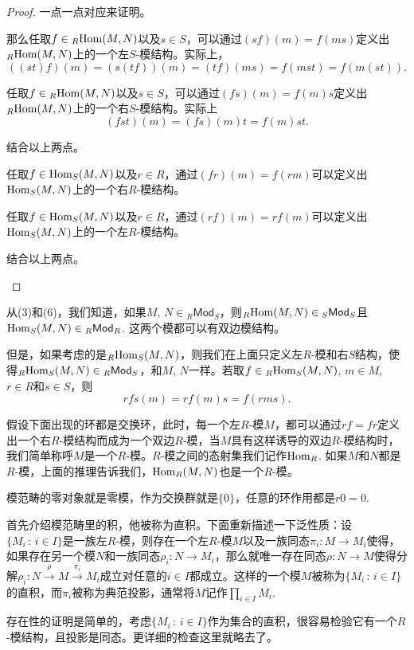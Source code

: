 \begin{proof}
一点一点对应来证明。     
\begin{compactenum}[(1)]
\item 那么任取$f\in {}_R\!\operatorname{Hom}(M,N)$以及$s\in S$，可以通过$(sf)(m)=f(ms)$定义出${}_R\!\operatorname{Hom}(M,N)$上的一个左$S$-模结构。实际上，
\[
	((st)f)(m)=(s(tf))(m)=(tf)(ms)=f(mst)=f(m(st)).
\]

\item 任取$f\in {}_R\!\operatorname{Hom}(M,N)$以及$s\in S$，可以通过$(fs)(m)=f(m)s$定义出${}_R\!\operatorname{Hom}(M,N)$上的一个右$S$-模结构。实际上
\[
	(fst)(m)=(fs)(m)t=f(m)st.
\]

\item 结合以上两点。

\item 任取$f\in \operatorname{Hom}_S(M,N)$以及$r\in R$，通过$(fr)(m)=f(rm)$可以定义出$\operatorname{Hom}_S(M,N)$上的一个右$R$-模结构。

\item 任取$f\in \operatorname{Hom}_S(M,N)$以及$r\in R$，通过$(rf)(m)=rf(m)$可以定义出$\operatorname{Hom}_S(M,N)$上的一个左$R$-模结构。

\item 结合以上两点。\qedhere
\end{compactenum}
\end{proof}

从(3)和(6)，我们知道，如果$M$, $N\in {}_R\mathsf{Mod}_S$，则${}_R\!\operatorname{Hom}(M,N)\in {}_S\mathsf{Mod}_S$且$\operatorname{Hom}_S(M,N)\in {}_R\mathsf{Mod}_R$. 这两个模都可以有双边模结构。

但是，如果考虑的是${}_R\!\operatorname{Hom}_S(M,N)$，则我们在上面只定义左$R$-模和右$S$结构，使得${}_R\!\operatorname{Hom}_S(M,N)\in {}_R\mathsf{Mod}_S$，和$M$, $N$一样。若取$f\in {}_R\!\operatorname{Hom}_S(M,N)$, $m\in M$, $r\in R$和$s\in S$，则
\[
	rfs(m)=rf(m)s=f(rms).
\]

假设下面出现的环都是交换环，此时，每一个左$R$-模$M$，都可以通过$rf=fr$定义出一个右$R$-模结构而成为一个双边$R$-模，当$M$具有这样诱导的双边$R$-模结构时，我们简单称呼$M$是一个$R$-模。$R$-模之间的态射集我们记作$\operatorname{Hom}_R$. 如果$M$和$N$都是$R$-模，上面的推理告诉我们，$\operatorname{Hom}_R(M,N)$也是一个$R$-模。

\begin{para}[零对象]
模范畴的零对象就是零模，作为交换群就是$\{0\}$，任意的环作用都是$r0=0$.
\end{para}

\begin{para}[直积]
首先介绍模范畴里的积，他被称为直积。下面重新描述一下泛性质：设$\{M_i\,:\, i\in I\}$是一族左$R$-模，则存在一个左$R$-模$M$以及一族同态$\pi_i:M\to M_i$使得，如果存在另一个模$N$和一族同态$\rho_i:N\to M_i$，那么就唯一存在同态$\rho:N\to M$使得分解$\rho_i:N\xrightarrow{\rho} M \xrightarrow{\pi_i} M_i$成立对任意的$i\in I$都成立。这样的一个模$M$被称为$\{M_i\,:\, i\in I\}$的直积，而$\pi_i$被称为典范投影，通常将$M$记作$\prod_{i\in I}M_i$. 

存在性的证明是简单的，考虑$\{M_i\,:\, i\in I\}$作为集合的直积，很容易检验它有一个$R$-模结构，且投影是同态。更详细的检查这里就略去了。
\end{para}

